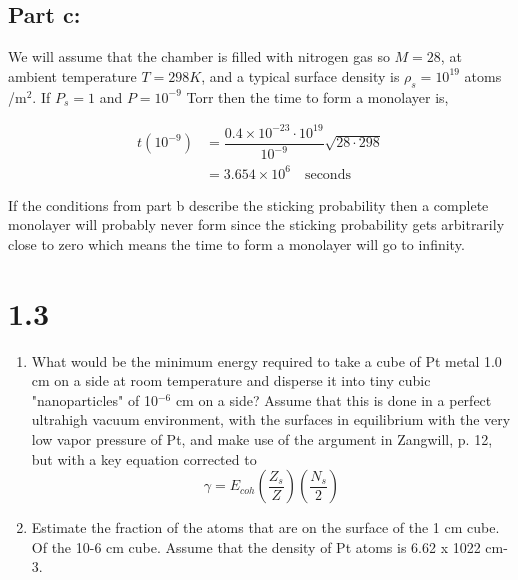 \documentclass[12pt]{article}
\renewcommand{\=}[1]{\stackrel{#1}{=}} %
\theoremstyle{definition}
\theoremstyle{remark}
\begin{document}
\subsection*{Part c:}

We will assume that the chamber is filled with nitrogen gas so $M=28$, at ambient temperature $T=298K$, and a typical surface density is $\rho_s = 10^19$ atoms /m$^2$. If $P_s = 1$ and $P=10^{-9}$ Torr then the time to form a monolayer is,

\begin{align*}
	t(10^{-9}) &= \dfrac{0.4\times10^{-23}\cdot10^{19}}{10^{-9}}\sqrt{28 \cdot 298}\\[3mm]
		&= 3.654 \times 10^6 \quad \text{seconds}
\end{align*}

If the conditions from part b describe the sticking probability then a complete monolayer will probably never form since the sticking probability gets arbitrarily close to zero which means the time to form a monolayer will go to infinity.


\newpage
\section*{1.3}
\begin{bclogo}[logo=\bcquestion , barre=none]
\newline
\begin{enumerate}
\item What would be the minimum energy required to take a cube of Pt metal 1.0 cm on a side at room temperature and disperse it into tiny cubic "nanoparticles" of 10$^{-6}$ cm on a side? Assume that this is done in a perfect ultrahigh vacuum environment, with the surfaces in equilibrium with the very low vapor pressure of Pt, and make use of the argument in Zangwill, p. 12, but with a key equation corrected to
\[
	\gamma = E_{coh} \left(\dfrac{Z_s}{Z}\right)\left(\dfrac{N_s}{2}\right)
\]
\item  Estimate the fraction of the atoms that are on the surface of the 1 cm cube. Of the 10-6 cm cube. Assume that the density of Pt atoms is 6.62 x 1022 cm-3. 
\end{enumerate}
 
\end{bclogo}
\vspace{2cm}
\end{document}
